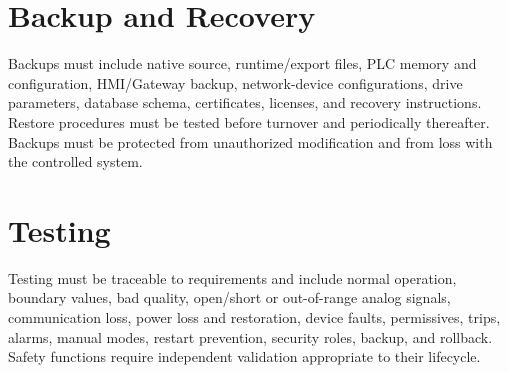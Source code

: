 \section{Backup and Recovery}
Backups must include native source, runtime/export files, PLC memory and configuration, HMI/Gateway backup, network-device configurations, drive parameters, database schema, certificates, licenses, and recovery instructions. Restore procedures must be tested before turnover and periodically thereafter. Backups must be protected from unauthorized modification and from loss with the controlled system.

\section{Testing}
Testing must be traceable to requirements and include normal operation, boundary values, bad quality, open/short or out-of-range analog signals, communication loss, power loss and restoration, device faults, permissives, trips, alarms, manual modes, restart prevention, security roles, backup, and rollback. Safety functions require independent validation appropriate to their lifecycle.
